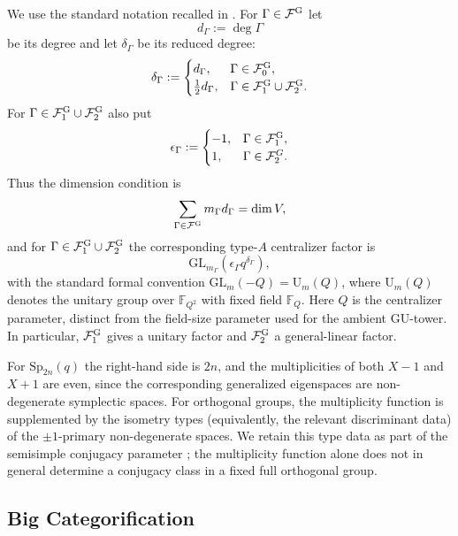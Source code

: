 \documentclass[12pt]{amsart}
\numberwithin{itemcounter}{subsection}
\theoremstyle{plain}
\theoremstyle{definition}
\theoremstyle{remark}
\numberwithin{equation}{section}
\def\bbF{\mathbb{F}}
\def\calF{\mathcal{F}}
\def\Sp{\mathrm{Sp}}
\def\GL{\mathrm{GL}}
\def\GU{\mathrm{GU}}
\begin{document}
\begin{enumerate}
        We use the standard notation recalled in \cite[\S4.1.5]{LSZ25}.
        For $\Gamma\in\calF^{\rm G}$ let
        \[
          d_\Gamma:=\deg\Gamma
        \]
        be its degree and let $\delta_\Gamma$ be its reduced degree:
        \[
          \delta_\Gamma:=
          \begin{cases}
            d_\Gamma,&\Gamma\in\calF^{\rm G}_0,\\
            \frac12d_\Gamma,&\Gamma\in\calF^{\rm G}_1\cup\calF^{\rm G}_2.
          \end{cases}
        \]
        For $\Gamma\in\calF^{\rm G}_1\cup\calF^{\rm G}_2$ also put
        \[
          \epsilon_\Gamma:=
          \begin{cases}
            -1,&\Gamma\in\calF^{\rm G}_1,\\
            1,&\Gamma\in\calF^G_2.
          \end{cases}
        \]
        Thus the dimension condition is
        \[
          \sum_{\Gamma\in\calF^{\rm G}}m_\Gamma d_\Gamma=\dim V,
        \]
        and for $\Gamma\in\calF^{\rm G}_1\cup\calF^{\rm G}_2$ the corresponding type-$A$ centralizer factor is
        \[
          \GL_{m_\Gamma}(\epsilon_\Gamma q^{\delta_\Gamma}),
        \]
        with the standard formal convention
        \(\GL_m(-Q)=\mathrm U_m(Q)\), where \(\mathrm U_m(Q)\) denotes the
        unitary group over \(\bbF_{Q^2}\) with fixed field \(\bbF_Q\).
        Here \(Q\) is the centralizer parameter, distinct from the field-size
        parameter used for the ambient \(\GU\)-tower.  In particular,
        $\calF^{\rm G}_1$ gives a unitary factor and $\calF^{\rm G}_2$ a general-linear factor.

        For $\Sp_{2n}(q)$ the right-hand side is $2n$, and the multiplicities of both $X-1$ and $X+1$ are even, since the corresponding generalized eigenspaces are non-degenerate symplectic spaces.
			For orthogonal groups, the multiplicity function is supplemented by the isometry types (equivalently, the relevant discriminant data) of the $\pm1$-primary non-degenerate spaces. We retain this type data as part of the semisimple conjugacy parameter \cite{Wall63,FS89}; the multiplicity function alone does not in general determine a conjugacy class in a fixed full orthogonal group.

		\end{enumerate}

\subsection{Big Categorification}
\end{document}
